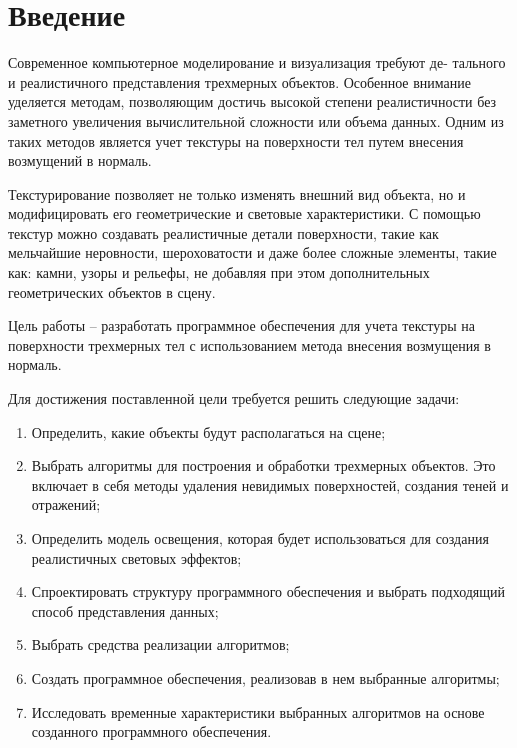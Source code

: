 	\chapter*{Введение}

Современное компьютерное моделирование и визуализация требуют де-
тального и реалистичного представления трехмерных объектов. Особенное внимание уделяется методам, позволяющим достичь высокой степени реалистичности без заметного увеличения вычислительной сложности или объема данных. Одним из таких методов является учет текстуры на поверхности тел путем внесения возмущений в нормаль.

Текстурирование позволяет не только изменять внешний вид объекта, но и модифицировать его геометрические и световые характеристики. С помощью текстур можно создавать реалистичные детали поверхности, такие как мельчайшие неровности, шероховатости и даже более сложные элементы, такие как: камни, узоры и рельефы, не добавляя при этом дополнительных геометрических объектов в сцену.

Цель работы – разработать программное обеспечения для учета текстуры на поверхности трехмерных тел с использованием метода внесения возмущения в нормаль.

Для достижения поставленной цели требуется решить следующие задачи:
\begin{enumerate}[label=\arabic*)]
    \item Определить, какие объекты будут располагаться на сцене;
    \item Выбрать алгоритмы для построения и обработки трехмерных объектов. Это включает в себя методы удаления невидимых поверхностей, создания теней и отражений;
    \item Определить модель освещения, которая будет использоваться для создания реалистичных световых эффектов;
    \item Спроектировать структуру программного обеспечения и выбрать подходящий способ представления данных;
    \item Выбрать средства реализации алгоритмов;
    \item Создать программное обеспечения, реализовав в нем выбранные алгоритмы;
    \item Исследовать временные характеристики выбранных алгоритмов на основе созданного программного обеспечения.
\end{enumerate}
